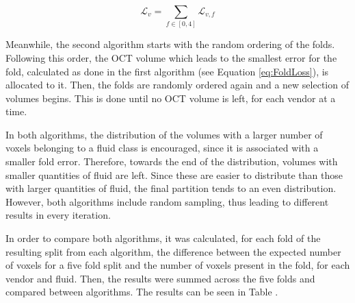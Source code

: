 \begin{equation}
	\mathcal{L}_{v} = \sum_{f \in [0,4]} \mathcal{L}_{v, f} 
	\label{eq:AllFoldsLoss}
\end{equation}

\par
Meanwhile, the second algorithm starts with the random ordering of the folds. Following this order, the OCT volume which leads to the smallest error for the fold, calculated as done in the first algorithm (see Equation \ref{eq:FoldLoss}), is allocated to it. Then, the folds are randomly ordered again and a new selection of volumes begins. This is done until no OCT volume is left, for each vendor at a time.
\par 
In both algorithms, the distribution of the volumes with a larger number of voxels belonging to a fluid class is encouraged, since it is associated with a smaller fold error. Therefore, towards the end of the distribution, volumes with smaller quantities of fluid are left. Since these are easier to distribute than those with larger quantities of fluid, the final partition tends to an even distribution. However, both algorithms include random sampling, thus leading to different results in every iteration.
\par
In order to compare both algorithms, it was calculated, for each fold of the resulting split from each algorithm, the difference between the expected number of voxels for a five fold split and the number of voxels present in the fold, for each vendor and fluid. Then, the results were summed across the five folds and compared between algorithms. The results can be seen in Table .

